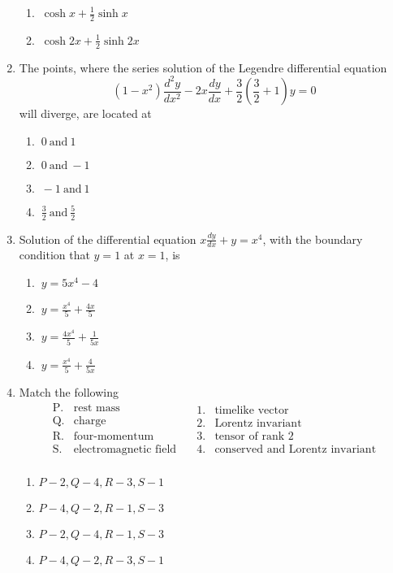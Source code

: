 \documentclass[journal]{IEEEtran}
\begin{document}
\begin{enumerate}
\begin{enumerate}
\item $\ \cosh x + \frac{1}{2}\sinh x$
\item $\ \cosh 2x + \frac{1}{2}\sinh 2x$
\end{enumerate}
\item The points, where the series solution of the Legendre differential equation
\[
(1 - x^2)\frac{d^2 y}{dx^2} - 2x\frac{dy}{dx} + \frac{3}{2}\left(\frac{3}{2}+1\right)y = 0 
\]
will diverge, are located at
\begin{enumerate}
\item $ \ 0 \ \text{and} \ 1$
\item $ \ 0 \ \text{and} \ -1$
\item $ \ -1 \ \text{and} \ 1$
\item $ \ \frac{3}{2} \ \text{and} \ \frac{5}{2} $
\end{enumerate}
\newpage
\item Solution of the differential equation \( x \frac{dy}{dx} + y = x^4 \), with the boundary condition that \( y = 1 \) at \( x = 1 \), is
\begin{enumerate}
\item $ \ y = 5x^4 - 4$
\item $\ y = \frac{x^4}{5} + \frac{4x}{5} $
\item $ \ y = \frac{4x^4}{5} + \frac{1}{5x} $
\item $\ y = \frac{x^4}{5} + \frac{4}{5x} $
\end{enumerate} 
\item Match the following \\ \[
\begin{array}{cl}
\text{P.} & \text{rest mass} \\
\text{Q.} & \text{charge} \\
\text{R.} & \text{four-momentum} \\
\text{S.} & \text{electromagnetic field} \\
\end{array}
\quad
\begin{array}{cl}
1. & \text{timelike vector} \\
2. & \text{Lorentz invariant} \\
3. & \text{tensor of rank 2} \\
4. & \text{conserved and Lorentz invariant} \\
\end{array}
\]
\begin{enumerate}
    \item $P-2,Q-4,R-3,S-1$
    \item $P-4,Q-2,R-1,S-3$
    \item $P-2,Q-4,R-1,S-3$
    \item $P-4,Q-2,R-3,S-1$
    \end{enumerate}


\end{enumerate}
\end{document}
